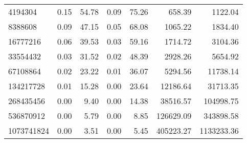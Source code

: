 \begin{tabular}{lrrrrrr}
4194304    &        0.15 &         54.78 &           0.09 &        75.26 &           658.39 &         1122.04 \\
8388608    &        0.09 &         47.15 &           0.05 &        68.08 &          1065.22 &         1834.40 \\
16777216   &        0.06 &         39.53 &           0.03 &        59.16 &          1714.72 &         3104.36 \\
33554432   &        0.03 &         31.52 &           0.02 &        48.39 &          2928.26 &         5654.92 \\
67108864   &        0.02 &         23.22 &           0.01 &        36.07 &          5294.56 &        11738.14 \\
134217728  &        0.01 &         15.28 &           0.00 &        23.64 &         12186.64 &        31713.35 \\
268435456  &        0.00 &          9.40 &           0.00 &        14.38 &         38516.57 &       104998.75 \\
536870912  &        0.00 &          5.79 &           0.00 &         8.85 &        126629.09 &       343898.58 \\
1073741824 &        0.00 &          3.51 &           0.00 &         5.45 &        405223.27 &      1133233.36 \\
\bottomrule
\end{tabular}
